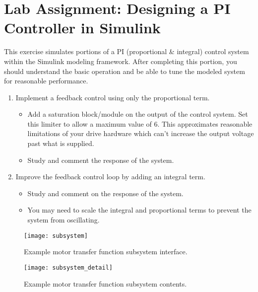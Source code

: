 \documentclass[openany,11pt,fleqn]{book} %
\begin{document}
\section{Lab Assignment: Designing a PI Controller in Simulink}
This exercise simulates portions of a PI (proportional \& integral) control system within the Simulink modeling framework. After completing this portion, you should understand the basic operation and be able to tune the modeled system for reasonable performance. 

\begin{enumerate}
    \item Implement a feedback control using only the proportional term. 
    \begin{itemize}
        \item Add a saturation block/module on the output of the control system. Set this limiter to allow a maximum value of 6. This approximates reasonable limitations of your drive hardware which can't increase the output voltage past what is supplied.  
        \item Study and comment the response of the system.
    \end{itemize}
    \item Improve the feedback control loop by adding an integral term. 
    \begin{itemize}
        \item Study and comment on the response of the system.
        \item You may need to scale the integral and proportional terms to prevent the system from oscillating.
    \end{itemize}
    
    
\end{enumerate}




\begin{figure}[tb]
    \centering\texttt{[image: subsystem]}
    \caption{Example motor transfer function subsystem interface.}
    \label{subsystem}
\end{figure}


\begin{figure}[b]
    \begin{center}
        \hspace*{-3.4cm}
        \texttt{[image: subsystem\_detail]}
        \caption{Example motor transfer function subsystem contents.}
        \label{subsystem_detail}
    \end{center}
\end{figure}
\end{document}
